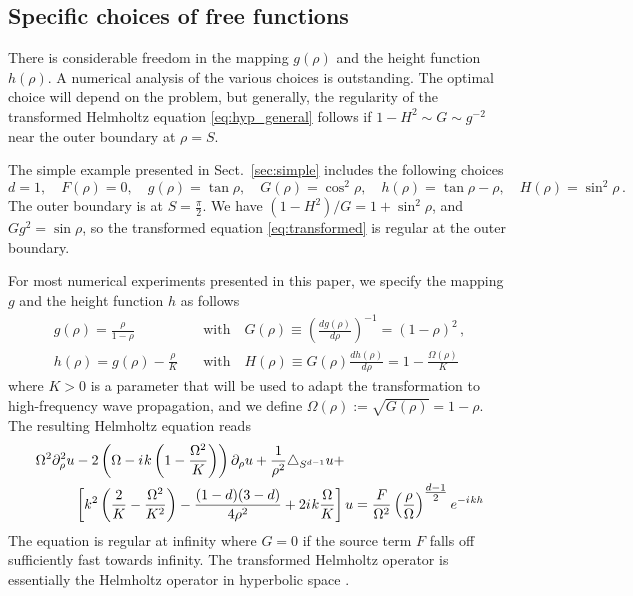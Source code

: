 \documentclass[draft,onefignum,onetabnum]{siamart190516}
\newcommand{\iu}{{i\mkern1mu}}
\begin{document}
\subsection{Specific choices of free functions}
There is considerable freedom in the mapping $g(\rho)$ and the height function $h(\rho)$. A numerical analysis of the various choices is outstanding. The optimal choice will depend on the problem, but generally, the regularity of the transformed Helmholtz equation \eqref{eq:hyp_general} follows if $1-H^2\sim G\sim g^{-2}$ near the outer boundary at $\rho=S$. 

The simple example presented in Sect.~\ref{sec:simple} includes the following choices
\[ d=1, \quad F(\rho)=0, \quad g(\rho)=\tan \rho, \quad G(\rho) = \cos^2\rho, \quad h(\rho) =\tan\rho - \rho, \quad H(\rho)= \sin^2\rho\,.\]
The outer boundary is at $S=\tfrac{\pi}{2}$. We have $(1-H^2)/G = 1+\sin^2\rho$, and $G g^2 = \sin\rho$, so the transformed equation \eqref{eq:transformed} is regular at the outer boundary. 

For most numerical experiments presented in this paper, we specify the mapping $g$ and the height function $h$ as follows
\begin{align} 
\label{eq:g}
g(\rho) = \frac{\rho}{1-\rho} \quad &\mathrm{with}\quad G(\rho) \equiv \left(\frac{d g(\rho)}{d\rho}\right)^{-1} = (1-\rho)^2\,, \\
\label{eq:h}
h(\rho) = g(\rho) - \frac{\rho}{K} \quad &\mathrm{with}\quad H(\rho) \equiv G(\rho) \frac{d h(\rho)}{d\rho} = 1 - \frac{\Omega(\rho)}{K} 
\end{align}
where $K>0$ is a parameter that will be used to adapt the transformation to high-frequency wave propagation, and we define $\Omega(\rho):=\sqrt{G(\rho)} = 1-\rho$. 
The resulting Helmholtz equation reads
\begin{align}\label{eq:hyp_specific}
	\Omega^2 \partial_\rho^2 u & - 2\left(\Omega - \iu k \left(1-\frac{\Omega^2}{K}\right)\right) \partial_\rho u + \frac{1}{\rho^2}\triangle_{S^{d-1}} u + \nonumber \\
	             & \left[k^2 \left( \frac{2}{K} - \frac{\Omega^2}{K^2} \right) - \frac{(1-d)(3-d)}{4 \rho^2} + 2 \iu k \frac{\Omega}{K} \right] u = \frac{F}{\Omega^2} \left(\frac{\rho}{\Omega}\right)^{\tfrac{d-1}{2}} e^{-\iu k h}
\end{align}
The equation is regular at infinity where $G=0$ if the source term $F$ falls off sufficiently fast towards infinity. The transformed Helmholtz operator is essentially the Helmholtz operator in hyperbolic space \cite{stoll2016harmonic}. 
\end{document}
